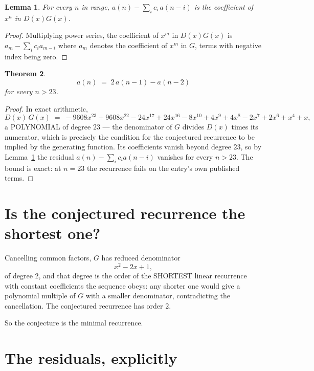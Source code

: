 \documentclass[11pt,a4paper]{article}
\theoremstyle{plain}
\newtheorem{theorem}{Theorem}
\newtheorem{lemma}[theorem]{Lemma}
\theoremstyle{definition}
\begin{document}
\begin{lemma}\label{lem:key}
For every $n$ in range, $a(n)-\sum_i c_i\,a(n-i)$ is the coefficient of $x^{n}$ in
$D(x)G(x)$.
\end{lemma}

\begin{proof}
Multiplying power series, the coefficient of $x^{m}$ in $D(x)G(x)$ is
$a_m-\sum_i c_i a_{m-i}$ where $a_m$ denotes the coefficient of $x^{m}$ in $G$, terms with
negative index being zero.
\end{proof}

\begin{theorem}
\[
a(n)\;=\;2\,a(n-1) - a(n-2)
\]
for every $n>23$.
\end{theorem}

\begin{proof}
In exact arithmetic,
\[
D(x)\,G(x)\;=\;- 9608 x^{23} + 9608 x^{22} - 24 x^{17} + 24 x^{16} - 8 x^{10} + 4 x^{9} + 4 x^{8} - 2 x^{7} + 2 x^{6} + x^{4} + x,
\]
a POLYNOMIAL of degree $23$ --- the denominator of $G$ divides $D(x)$ times its numerator,
which is precisely the condition for the conjectured recurrence to be implied by the
generating function. Its coefficients vanish beyond degree $23$, so by
Lemma~\ref{lem:key} the residual $a(n)-\sum_ic_ia(n-i)$ vanishes for every
$n>23$. The bound is exact: at $n=23$ the recurrence fails on the entry's own published terms.
\end{proof}

\section{Is the conjectured recurrence the shortest one?}

Cancelling common factors, $G$ has reduced denominator
\[
x^{2} - 2 x + 1,
\]
of degree $2$, and that degree is the order of the SHORTEST linear recurrence with
constant coefficients the sequence obeys: any shorter one would give a polynomial multiple of
$G$ with a smaller denominator, contradicting the cancellation. The conjectured recurrence has
order $2$.

So the conjecture is the minimal recurrence.

\section{The residuals, explicitly}
\end{document}
